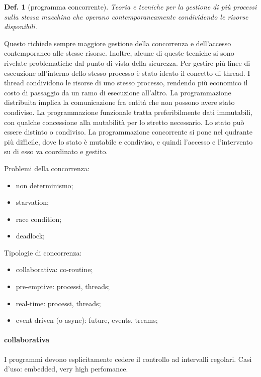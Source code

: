 \documentclass{article}
\newtheorem{definition}{Def.}[section]
\begin{document}
\begin{definition}[programma concorrente]
	Teoria e tecniche per la gestione di più processi sulla stessa macchina che
	operano contemporaneamente condividendo le risorse disponibili.
\end{definition}

Questo richiede sempre maggiore gestione della concorrenza e dell'accesso
contemporaneo alle stesse risorse. Inoltre, alcune di queste tecniche si sono
rivelate problematiche dal punto di vista della sicurezza.
Per gestire più linee di esecuzione all'interno dello stesso processo è stato
ideato il concetto di thread. I thread condividono le risorse di uno stesso
processo, rendendo più economico il costo di passaggio da un ramo di esecuzione
all'altro.
La programmazione distribuita implica la comunicazione fra entità che non
possono avere stato condiviso.
La programmazione funzionale tratta preferibilmente dati immutabili, con qualche
concessione alla mutabilità per lo stretto necessario. Lo stato può essere
distinto o condiviso.
La programmazione concorrente si pone nel qudrante più difficile, dove lo stato
è mutabile e condiviso, e quindi l'accesso e l'intervento su di esso va
coordinato e gestito.

Problemi della concorrenza:
	\begin{itemize}
		\item non determinismo;
		
		\item starvation;

		\item race condition;

		\item deadlock;
	\end{itemize}

Tipologie di concorrenza:
	\begin{itemize}
		\item collaborativa: co-routine;
		
		\item pre-emptive: processi, threads;

		\item real-time: processi, threads;

		\item event driven (o async): future, events, treams;
	\end{itemize}

\paragraph{collaborativa}
I programmi devono esplicitamente cedere il controllo ad intervalli regolari.
Casi d'uso: embedded, very high perfomance.
\end{document}
